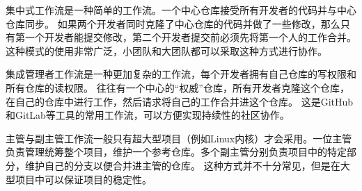 \documentclass[../main.tex]{subfiles}
\begin{document}
集中式工作流是一种简单的工作流。一个中心仓库接受所有开发者的代码并与中心仓库同步。
如果两个开发者同时克隆了中心仓库的代码并做了一些修改，那么只有第一个开发者能提交修改，第二个开发者提交前必须先将第一个人的工作合并。
这种模式的使用非常广泛，小团队和大团队都可以采取这种方式进行协作。

集成管理者工作流是一种更加复杂的工作流，每个开发者拥有自己仓库的写权限和所有仓库的读权限。
往往有一个中心的“权威”仓库，所有开发者克隆这个仓库，在自己的仓库中进行工作，然后请求将自己的工作合并进这个仓库。
这是GitHub和GitLab等工具的常用工作流，可以方便实现持续性的社区协作。

主管与副主管工作流一般只有超大型项目（例如Linux内核）才会采用。一位主管负责管理统筹整个项目，维护一个参考仓库。多个副主管分别负责项目中的特定部分，维护自己的分支以便合并进主管的仓库。
这种方式并不十分常见，但是在大型项目中可以保证项目的稳定性。
\end{document}
